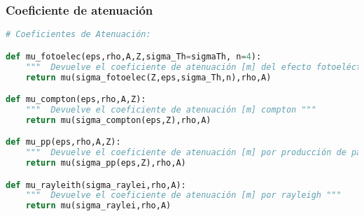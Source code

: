 \subsubsection{Coeficiente de atenuación}
\begin{lstlisting}[language=python]
# Coeficientes de Atenuación: 

def mu_fotoelec(eps,rho,A,Z,sigma_Th=sigmaTh, n=4):
    """  Devuelve el coeficiente de atenuación [m] del efecto fotoeléctrico. """
    return mu(sigma_fotoelec(Z,eps,sigma_Th,n),rho,A)

def mu_compton(eps,rho,A,Z):
    """  Devuelve el coeficiente de atenuación [m] compton """
    return mu(sigma_compton(eps,Z),rho,A)

def mu_pp(eps,rho,A,Z):
    """  Devuelve el coeficiente de atenuación [m] por producción de pares """
    return mu(sigma_pp(eps,Z),rho,A)

def mu_rayleith(sigma_raylei,rho,A):
    """  Devuelve el coeficiente de atenuación [m] por rayleigh """
    return mu(sigma_raylei,rho,A)

\end{lstlisting}